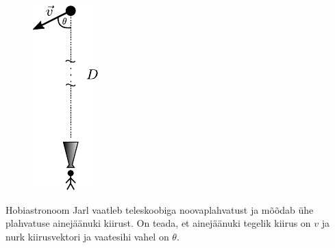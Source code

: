 
\begin{figure}
		\vspace{10pt}
		\includegraphics[width=1.1\linewidth]{2020-lahg-04-yl.pdf}
	\end{figure}
	Hobiastronoom Jarl vaatleb teleskoobiga noovaplahvatust ja mõõdab ühe plahvatuse ainejäänuki kiirust. On teada, et ainejäänuki tegelik kiirus on $v$ ja nurk kiirusvektori ja vaatesihi vahel on $\theta$.
	

